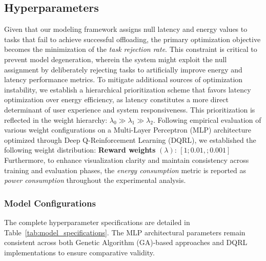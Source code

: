 \documentclass[preprint,12pt]{elsarticle}
\begin{document}
\subsection{Hyperparameters}
Given that our modeling framework assigns null latency and energy values to tasks that fail to achieve successful offloading, the primary optimization objective becomes the minimization of the \emph{task rejection rate}. This constraint is critical to prevent model degeneration, wherein the system might exploit the null assignment by deliberately rejecting tasks to artificially improve energy and latency performance metrics.
To mitigate additional sources of optimization instability, we establish a hierarchical prioritization scheme that favors latency optimization over energy efficiency, as latency constitutes a more direct determinant of user experience and system responsiveness. This prioritization is reflected in the weight hierarchy: $\lambda_0 \gg \lambda_1 \gg \lambda_2$.
Following empirical evaluation of various weight configurations on a Multi-Layer Perceptron (MLP) architecture optimized through Deep Q-Reinforcement Learning (DQRL), we established the following weight distribution:
\textbf{Reward weights} $(\lambda)$: $[1; 0.01,; 0.001]$
Furthermore, to enhance visualization clarity and maintain consistency across training and evaluation phases, the \emph{energy consumption} metric is reported as \emph{power consumption} throughout the experimental analysis.
\subsubsection{Model Configurations}
The complete hyperparameter specifications are detailed in Table~\ref{tab:model_specifications}. The MLP architectural parameters remain consistent across both Genetic Algorithm (GA)-based approaches and DQRL implementations to ensure comparative validity.


\begin{table}[H]
\centering
\caption{Model Specifications}
\label{tab:model_specifications}
\end{table}
\end{document}
